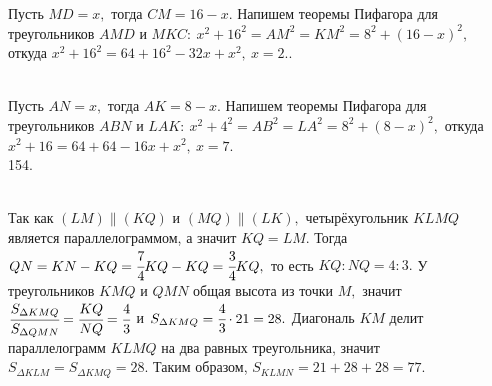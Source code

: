 \documentclass[12pt]{article}
\begin{document}
Пусть $MD=x,$ тогда $CM=16-x.$ Напишем теоремы Пифагора для треугольников $AMD$ и $MKC:\ x^2+16^2=AM^2=KM^2=8^2+(16-x)^2,$ откуда $x^2+16^2=64+16^2-32x+x^2,\ x=2.$\newpage{}. \begin{figure}[ht!]
\end{figure}\\
Пусть $AN=x,$ тогда $AK=8-x.$ Напишем теоремы Пифагора для треугольников $ABN$ и $LAK:\ x^2+4^2=AB^2=LA^2=8^2+(8-x)^2,$ откуда $x^2+16=64+64-16x+x^2,\ x=7.$\\
154. \begin{figure}[ht!]
\end{figure}\\
Так как $(LM)\parallel (KQ)$ и $(MQ)\parallel(LK),$ четырёхугольник $KLMQ$ является параллелограммом, а значит $KQ=LM.$ Тогда $QN=KN-KQ=\cfrac{7}{4}KQ-KQ=\cfrac{3}{4}KQ,$ то есть $KQ:NQ=4:3.$ У треугольников $KMQ$ и $QMN$ общая высота из точки $M,$ значит $\cfrac{S_{\Delta KMQ}}{S_{\Delta QMN}}=\cfrac{KQ}{NQ}=\cfrac{4}{3}$ и $S_{\Delta KMQ}=\cfrac{4}{3}\cdot21=28.$ Диагональ $KM$ делит параллелограмм $KLMQ$ на два равных треугольника, значит $S_{\Delta KLM}=S_{\Delta KMQ}=28.$ Таким образом, $S_{KLMN}=21+28+28=77.$\\
\end{document}

